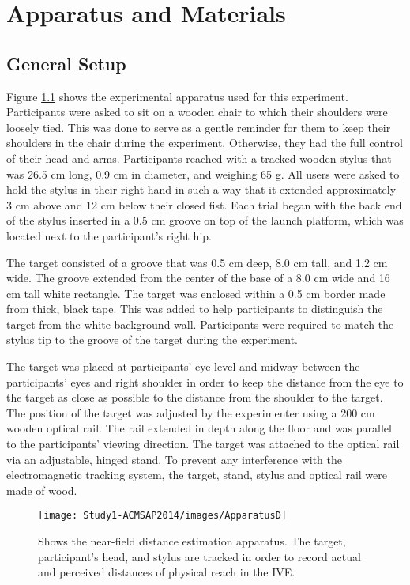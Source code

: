 \chapter{Apparatus and Materials}\label{chaperApparatus}

\section{General Setup}
Figure \ref{fig:apparatus} shows the experimental apparatus used for this experiment. Participants were asked to sit on a wooden chair to which their shoulders were loosely tied. This was done to serve as a gentle reminder for them to keep their shoulders in the chair during the experiment. Otherwise, they had the full control of their head and arms. Participants reached with a tracked wooden stylus that was 26.5 cm long, 0.9 cm in diameter, and weighing 65 g. All users were asked to hold the stylus in their right hand in such a way that it extended approximately 3 cm above and 12 cm below their closed fist. Each trial began with the back end of the stylus inserted in a 0.5 cm groove on top of the launch platform, which was located next to the participant's right hip.

The target consisted of a groove that was 0.5 cm deep, 8.0 cm tall, and 1.2 cm wide. The groove extended from the center of the base of a 8.0 cm wide and 16 cm tall white rectangle. The target was enclosed within a 0.5 cm border made from thick, black tape. This was added to help participants to distinguish the target from the white background wall. Participants were required to match the stylus tip to the groove of the target during the experiment.

The target was placed at participants' eye level and midway between the participants' eyes and right shoulder in order to keep the distance from the eye to the target as close as possible to the distance from the shoulder to the target. The position of the target was adjusted by the experimenter using a 200 cm wooden optical rail. The rail extended in depth along the floor and was parallel to the participants' viewing direction. The target was attached to the optical rail via an adjustable, hinged stand. To prevent any interference with the electromagnetic tracking system, the target, stand, stylus and optical rail were made of wood.

\begin{figure}[th!]
	\centering
	\texttt{[image: Study1-ACMSAP2014/images/ApparatusD]}
	\caption{Shows the near-field distance estimation apparatus. The target, participant's head, and stylus are tracked in order to record actual and perceived distances of physical reach in the IVE.}
	\label{fig:apparatus}
	
\end{figure}

